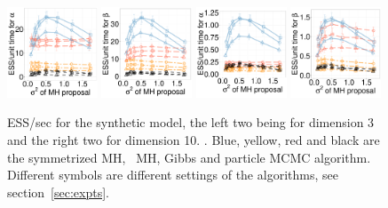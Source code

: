   \begin{figure}[H]
  \centering
  \begin{minipage}[h!]{0.99\linewidth}
  \centering
    \includegraphics [width=0.24\textwidth, angle=0]{figs/new_whole_exp_figs/exp_alpha_dim3.pdf}
    \includegraphics [width=0.24\textwidth, angle=0]{figs/new_whole_exp_figs/exp_beta_dim3.pdf}
    \includegraphics [width=0.24\textwidth, angle=0]{figs/new_whole_exp_figs/exp_alpha_dim10.pdf}
    \includegraphics [width=0.24\textwidth, angle=0]{figs/new_whole_exp_figs/exp_beta_dim10.pdf}
  \end{minipage}
    \caption{ESS/sec for the synthetic  model, the left two being for dimension 3 and the right two for dimension 10. . Blue, yellow, red and black are the symmetrized MH,
  \naive\ MH, Gibbs and particle MCMC algorithm. Different symbols are
different settings of the algorithms, see section~\ref{sec:expts}.}
     \label{fig:ESS_EXP_D33}
  \end{figure}

